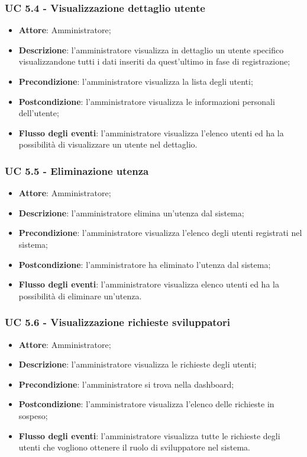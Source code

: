 \subsubsection{UC 5.4 - Visualizzazione dettaglio utente}
\begin{itemize}
\item \textbf{Attore}: Amministratore;
\item \textbf{Descrizione}: l'amministratore visualizza in dettaglio un utente specifico visualizzandone tutti i dati inseriti da quest'ultimo in fase di registrazione;
\item \textbf{Precondizione}: l'amministratore visualizza la lista degli utenti;
\item \textbf{Postcondizione}: l'amministratore visualizza le informazioni personali dell'utente;
\item \textbf{Flusso degli eventi}: l'amministratore visualizza l'elenco utenti ed ha la possibilità di visualizzare un utente nel dettaglio.
\end{itemize}


\subsubsection{UC 5.5 - Eliminazione utenza}
\begin{itemize}
\item \textbf{Attore}: Amministratore;
\item \textbf{Descrizione}: l'amministratore elimina un'utenza dal sistema;
\item \textbf{Precondizione}: l'amministratore visualizza l'elenco degli utenti registrati nel sistema;
\item \textbf{Postcondizione}: l'amministratore ha eliminato l'utenza dal sistema;
\item \textbf{Flusso degli eventi}: l'amministratore visualizza elenco utenti ed ha la possibilità di eliminare un'utenza.
\end{itemize}


\subsubsection{UC 5.6 - Visualizzazione richieste sviluppatori}
\begin{itemize}
\item \textbf{Attore}: Amministratore;
\item \textbf{Descrizione}: l'amministratore visualizza le richieste degli utenti;
\item \textbf{Precondizione}: l'amministratore si trova nella dashboard;
\item \textbf{Postcondizione}: l'amministratore visualizza l'elenco delle richieste in sospeso;
\item \textbf{Flusso degli eventi}:  l'amministratore visualizza tutte le richieste degli utenti che vogliono ottenere il ruolo di sviluppatore nel sistema.
\end{itemize}

